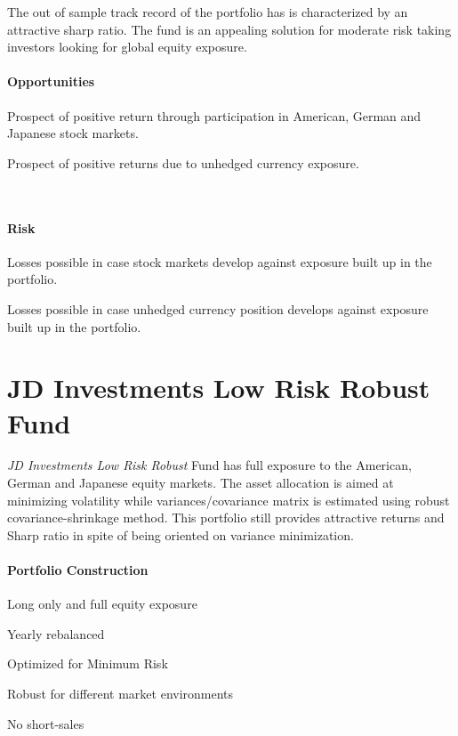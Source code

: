 \documentclass[11pt, parskip=full, DIV=14]{scrreprt}
\begin{document}
The out of sample track record of the portfolio has is characterized by an attractive sharp ratio.
The fund is an appealing solution for moderate risk taking investors looking for global equity exposure.

\begin{minipage}[t]{0.49\textwidth}
  \paragraph{Opportunities}
  \begin{sit}
    \item Prospect of positive return through participation in American, German and Japanese stock markets.
    \item Prospect of positive returns due to unhedged currency exposure.
  \end{sit}
\end{minipage}
~~
\begin{minipage}[t]{0.49\textwidth}
  \paragraph{Risk}
  \begin{sit}
    \item Losses possible in case stock markets develop against exposure built up in the portfolio.
    \item Losses possible in case unhedged currency position develops against exposure built up in the portfolio.    
  \end{sit}
\end{minipage}

\newpage\section*{JD Investments Low Risk Robust Fund}

\textit{JD Investments Low Risk Robust} Fund has full exposure to the American, German and Japanese equity markets.
The asset allocation is aimed at minimizing volatility while variances/covariance matrix is estimated using robust covariance-shrinkage method.
This portfolio still provides attractive returns and Sharp ratio in spite of being oriented on variance minimization.

\paragraph{Portfolio Construction}
\begin{sit}
\item Long only and full equity exposure
\item Yearly rebalanced
\item Optimized for Minimum Risk
\item Robust for different market environments
\item No short-sales
\end{sit}
\end{document}
